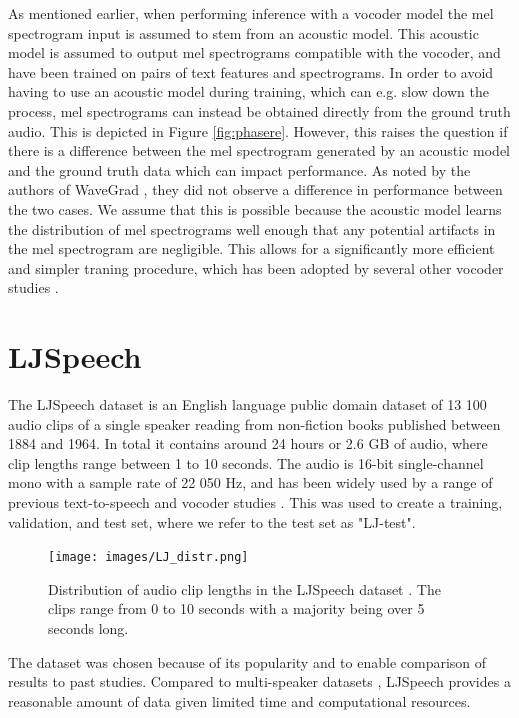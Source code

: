 \documentclass{report}
\begin{document}
As mentioned earlier, when performing inference with a vocoder model the mel spectrogram input is assumed to stem from an acoustic model. This acoustic model is assumed to output mel spectrograms compatible with the vocoder, and have been trained on pairs of text features and spectrograms. In order to avoid having to use an acoustic model during training, which can e.g. slow down the process, mel spectrograms can instead be obtained directly from the ground truth audio. This is depicted in Figure \ref{fig:phasere}. However, this raises the question if there is a difference between the mel spectrogram generated by an acoustic model and the ground truth data which can impact performance. As noted by the authors of WaveGrad \cite{chen2020wavegrad}, they did not observe a difference in performance between the two cases. We assume that this is possible because the acoustic model learns the distribution of mel spectrograms well enough that any potential artifacts in the mel spectrogram are negligible. This allows for a significantly more efficient and simpler traning procedure, which has been adopted by several other vocoder studies \cite{lee2021priorgrad, kong2020hifi, oord2016wavenet}.

\section{LJSpeech}

The LJSpeech dataset \cite{ljspeech17} is an English language public domain dataset of 13 100 audio clips of a single speaker reading from non-fiction books published between 1884 and 1964. In total it contains around 24 hours or 2.6 GB of audio, where clip lengths range between 1 to 10 seconds. The audio is 16-bit single-channel mono with a sample rate of 22 050 Hz, and has been widely used by a range of previous text-to-speech and vocoder studies \cite{tan2021survey, kong2020diffwave, lee2021priorgrad}. This was used to create a training, validation, and test set, where we refer to the test set as "LJ-test".

\begin{figure}[H]
    \centering
    \texttt{[image: images/LJ\_distr.png]}
    \caption{\onehalfspacing Distribution of audio clip lengths in the LJSpeech dataset \cite{ljspeech17}. The clips range from 0 to 10 seconds with a majority being over 5 seconds long.}
    \label{fig:my_label}
\end{figure}
The dataset was chosen because of its popularity and to enable comparison of results to past studies. Compared to multi-speaker datasets \cite{panayotov2015librispeech, zen2019libritts, ardila2019common}, LJSpeech provides a reasonable amount of data given limited time and computational resources.
\end{document}
